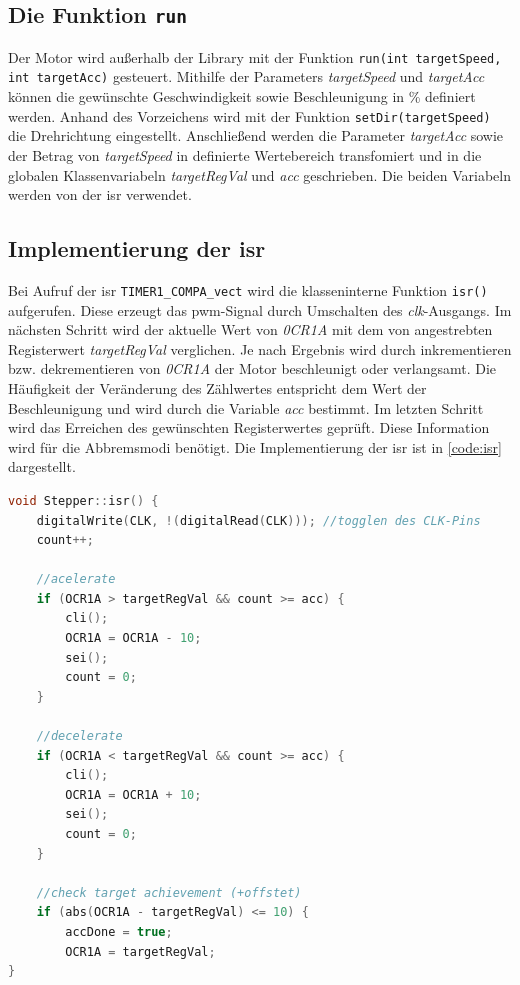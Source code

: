 \subsection{Die Funktion \texttt{run}}
\label{sec:run}	

Der Motor wird außerhalb der Library mit der Funktion \texttt{run(int targetSpeed, int targetAcc)} gesteuert. Mithilfe der Parameters \textit{targetSpeed} und \textit{targetAcc} können die gewünschte Geschwindigkeit sowie Beschleunigung in \% definiert werden. Anhand des Vorzeichens wird mit der Funktion \texttt{setDir(targetSpeed)} die Drehrichtung eingestellt. Anschließend werden die Parameter \textit{targetAcc} sowie der Betrag von \textit{targetSpeed} in definierte Wertebereich transfomiert und in die globalen Klassenvariabeln \textit{targetRegVal} und \textit{acc} geschrieben. 
Die beiden Variabeln werden von der \acrshort{isr} verwendet. 

\subsection{Implementierung der \acrshort{isr}}
\label{sec:isr}	
Bei Aufruf der \acrshort{isr} \texttt{TIMER1\_COMPA\_vect} wird die klasseninterne Funktion \texttt{isr()} aufgerufen. Diese erzeugt das \acrshort{pwm}-Signal durch Umschalten des \textit{clk}-Ausgangs. 
Im nächsten Schritt wird der aktuelle Wert von \textit{0CR1A} mit dem von angestrebten Registerwert \textit{targetRegVal} verglichen. Je nach Ergebnis wird durch inkrementieren bzw. dekrementieren von \textit{0CR1A} der Motor beschleunigt oder verlangsamt. Die Häufigkeit der Veränderung des Zählwertes entspricht dem Wert der Beschleunigung und wird durch die Variable \textit{acc} bestimmt. 
Im letzten Schritt wird das Erreichen des gewünschten Registerwertes geprüft. Diese Information wird für die Abbremsmodi benötigt. Die Implementierung der \acrshort{isr} ist in \autoref{code:isr} dargestellt. 

\begin{lstlisting}[language=c, style=dhpaperdefault]
void Stepper::isr() {
	digitalWrite(CLK, !(digitalRead(CLK))); //togglen des CLK-Pins
	count++;
	
	//acelerate
	if (OCR1A > targetRegVal && count >= acc) {
		cli();
		OCR1A = OCR1A - 10;
		sei();
		count = 0;
	}

	//decelerate
	if (OCR1A < targetRegVal && count >= acc) {
		cli();
		OCR1A = OCR1A + 10;
		sei();
		count = 0;
	}
	
	//check target achievement (+offstet)
	if (abs(OCR1A - targetRegVal) <= 10) {
		accDone = true;
		OCR1A = targetRegVal;
}

\end{lstlisting}


